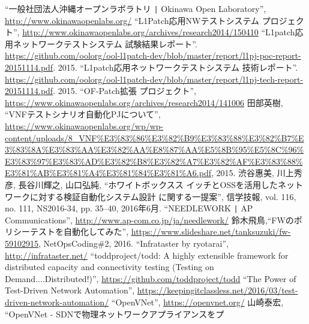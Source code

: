 
\begin{thebibliography}{99}
         ``一般社団法人沖縄オープンラボラトリ \verb+|+ Okinawa Open Laboratory'',
         \url{http://www.okinawaopenlabs.org/}
         ``L1Patch応用NWテストシステム プロジェクト'',
         \url{http://www.okinawaopenlabs.org/archives/research2014/150410}
         ``L1patch応用ネットワークテストシステム 試験結果レポート''.
         \url{https://github.com/oolorg/ool-l1patch-dev/blob/master/report/l1pj-poc-report-20151114.pdf}.
         2015.
         ``L1patch応用ネットワークテストシステム 技術レポート''.
         \url{https://github.com/oolorg/ool-l1patch-dev/blob/master/report/l1pj-tech-report-20151114.pdf}.
         2015.
         ``OF-Patch拡張 プロジェクト'',
         \url{https://www.okinawaopenlabs.org/archives/research2014/141006}
         田部英樹, ``VNFテストシナリオ自動化PJについて'',
         \url{https://www.okinawaopenlabs.org/wp/wp-content/uploads/8_VNF%E3%83%86%E3%82%B9%E3%83%88%E3%82%B7%E3%83%8A%E3%83%AA%E3%82%AA%E8%87%AA%E5%8B%95%E5%8C%96%E3%83%97%E3%83%AD%E3%82%B8%E3%82%A7%E3%82%AF%E3%83%88%E3%81%AB%E3%81%A4%E3%81%84%E3%81%A6.pdf}, 2015.
         渋谷惠美, 川上秀彦, 長谷川輝之, 山口弘純, ``ホワイトボックスス
         イッチとOSSを活用したネットワークに対する検証自動化システム設計
         に関する一提案'', 信学技報, vol. 116, no. 111, NS2016-34,
         pp. 35--40, 2016年6月.
         ``NEEDLEWORK \verb+|+ AP Communications'',
         \url{http://www.ap-com.co.jp/ja/needlework/}
         鈴木飛鳥,``FWのポリシーテストを自動化してみた'',
         \url{https://www.slideshare.net/tanksuzuki/fw-59102915},
         NetOpsCoding\#2, 2016.
         ``Infrataster by ryotarai'',
         \url{http://infrataster.net/}
         ``toddproject/todd: A highly extensible framework for distributed capacity and connectivity testing (Testing on Demand....Distributed!)'',
         \url{https://github.com/toddproject/todd}
         ``The Power of Test-Driven Network Automation'',
         \url{https://keepingitclassless.net/2016/03/test-driven-network-automation/}
         ``OpenVNet'', \url{https://openvnet.org/}
         山崎泰宏, ``OpenVNet - SDNで物理ネットワークアプライアンスをプ

\end{thebibliography}
